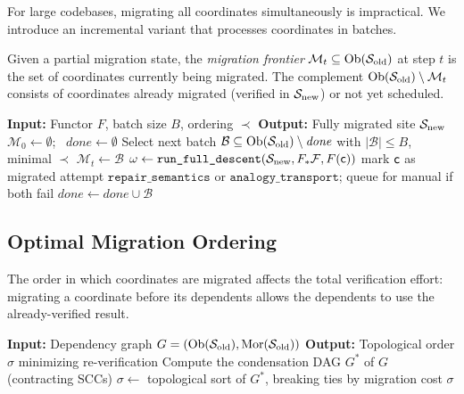 \documentclass[11pt]{article}
\newcommand{\RunDescent}{\texttt{run\_full\_descent}}
\newcommand{\RepairSem}{\texttt{repair\_semantics}}
\newcommand{\AnalTrans}{\texttt{analogy\_transport}}
\newcommand{\SiteOld}{\Site_{\mathrm{old}}}
\newcommand{\SiteNew}{\Site_{\mathrm{new}}}
\newcommand{\FunctorF}{F}
\newcommand{\Pushforward}{F_*}
\begin{document}
For large codebases, migrating all coordinates simultaneously is
impractical.  We introduce an incremental variant that processes coordinates
in batches.

\begin{definition}\label{def:migration-frontier}
Given a partial migration state, the \emph{migration frontier}
$\mathcal{M}_t \subseteq \Ob(\SiteOld)$ at step $t$ is the set of
coordinates currently being migrated.  The complement
$\Ob(\SiteOld) \setminus \mathcal{M}_t$ consists of coordinates already
migrated (verified in $\SiteNew$) or not yet scheduled.
\end{definition}

\begin{algorithm}[H]
\caption{Incremental Migration}
\label{alg:incremental}
\begin{algorithmic}[1]
\STATE \textbf{Input:} Functor $\FunctorF$, batch size $B$, ordering $\prec$
\STATE \textbf{Output:} Fully migrated site $\SiteNew$
\STATE $\mathcal{M}_0 \gets \emptyset$; \ $\mathit{done} \gets \emptyset$
\WHILE{$\mathit{done} \neq \Ob(\SiteOld)$}
  \STATE Select next batch $\mathcal{B} \subseteq \Ob(\SiteOld) \setminus \mathit{done}$ with $|\mathcal{B}| \leq B$, minimal \wrt $\prec$
  \STATE $\mathcal{M}_t \gets \mathcal{B}$
    \STATE $\omega \gets \RunDescent(\SiteNew, \Pushforward\mathcal{F}, \FunctorF(\coord))$
      \STATE mark $\mathsf{c}$ as migrated
    \ELSE
      \STATE attempt $\RepairSem$ or $\AnalTrans$; queue for manual if both fail
    \ENDIF
  \ENDFOR
  \STATE $\mathit{done} \gets \mathit{done} \cup \mathcal{B}$
\ENDWHILE
\end{algorithmic}
\end{algorithm}

\subsection{Optimal Migration Ordering}\label{sec:ordering}

The order in which coordinates are migrated affects the total verification
effort: migrating a coordinate before its dependents allows the dependents
to use the already-verified result.

\begin{algorithm}[H]
\caption{Optimal Migration Ordering}
\label{alg:ordering}
\begin{algorithmic}[1]
\STATE \textbf{Input:} Dependency graph $G = (\Ob(\SiteOld), \Mor(\SiteOld))$
\STATE \textbf{Output:} Topological order $\sigma$ minimizing re-verification
\STATE Compute the condensation DAG $G^*$ of $G$ (contracting SCCs)
\STATE $\sigma \gets$ topological sort of $G^*$, breaking ties by migration cost
\RETURN $\sigma$
\end{algorithmic}
\end{algorithm}
\end{document}
